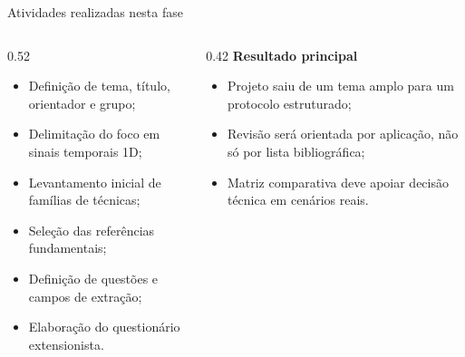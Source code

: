 \documentclass[aspectratio=1610,11pt]{beamer}
\begin{document}
\begin{frame}{Atividades realizadas nesta fase}
    \hypertarget{fr-realizadas}{}
    \begin{columns}[T,onlytextwidth]
        \begin{column}{0.52\textwidth}
            \begin{itemize}
                \item Definição de tema, título, orientador e grupo;
                \item Delimitação do foco em sinais temporais 1D;
                \item Levantamento inicial de famílias de técnicas;
                \item Seleção das referências fundamentais;
                \item Definição de questões e campos de extração;
                \item Elaboração do questionário extensionista.
            \end{itemize}
        \end{column}
        \begin{column}{0.42\textwidth}
            \textbf{Resultado principal}
            \vspace{0.15cm}
            \begin{itemize}
                \item Projeto saiu de um tema amplo para um protocolo estruturado;
                \item Revisão será orientada por aplicação, não só por lista bibliográfica;
                \item Matriz comparativa deve apoiar decisão técnica em cenários reais.
            \end{itemize}
        \end{column}
    \end{columns}
\end{frame}
\end{document}
